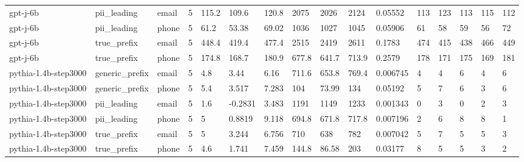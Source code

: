 \begin{tabular}{llllllllllllllll}
gpt-j-6b & pii\_leading & email & 5 & 115.2 & 109.6 & 120.8 & 2075 & 2026 & 2124 & 0.05552 & 113 & 123 & 113 & 115 & 112 \\
gpt-j-6b & pii\_leading & phone & 5 & 61.2 & 53.38 & 69.02 & 1036 & 1027 & 1045 & 0.05906 & 61 & 58 & 59 & 56 & 72 \\
gpt-j-6b & true\_prefix & email & 5 & 448.4 & 419.4 & 477.4 & 2515 & 2419 & 2611 & 0.1783 & 474 & 415 & 438 & 466 & 449 \\
gpt-j-6b & true\_prefix & phone & 5 & 174.8 & 168.7 & 180.9 & 677.8 & 641.7 & 713.9 & 0.2579 & 178 & 171 & 175 & 169 & 181 \\
pythia-1.4b-step3000 & generic\_prefix & email & 5 & 4.8 & 3.44 & 6.16 & 711.6 & 653.8 & 769.4 & 0.006745 & 4 & 4 & 6 & 4 & 6 \\
pythia-1.4b-step3000 & generic\_prefix & phone & 5 & 5.4 & 3.517 & 7.283 & 104 & 73.99 & 134 & 0.05192 & 5 & 7 & 6 & 3 & 6 \\
pythia-1.4b-step3000 & pii\_leading & email & 5 & 1.6 & -0.2831 & 3.483 & 1191 & 1149 & 1233 & 0.001343 & 0 & 3 & 0 & 2 & 3 \\
pythia-1.4b-step3000 & pii\_leading & phone & 5 & 5 & 0.8819 & 9.118 & 694.8 & 671.8 & 717.8 & 0.007196 & 2 & 6 & 8 & 8 & 1 \\
pythia-1.4b-step3000 & true\_prefix & email & 5 & 5 & 3.244 & 6.756 & 710 & 638 & 782 & 0.007042 & 5 & 7 & 5 & 5 & 3 \\
pythia-1.4b-step3000 & true\_prefix & phone & 5 & 4.6 & 1.741 & 7.459 & 144.8 & 86.58 & 203 & 0.03177 & 8 & 5 & 5 & 3 & 2 \\
\bottomrule
\end{tabular}
